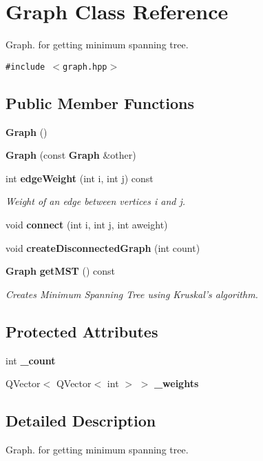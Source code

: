\section{Graph Class Reference}
\label{classGraph}
Graph. for getting minimum spanning tree.  


{\tt \#include $<$graph.hpp$>$}

\subsection*{Public Member Functions}
\begin{CompactItemize}
\item 
{\bf Graph} ()
\item 
{\bf Graph} (const {\bf Graph} \&other)
\item 
int {\bf edge\-Weight} (int i, int j) const 
\begin{CompactList}\small\item\em Weight of an edge between vertices i and j. \item\end{CompactList}\item 
void {\bf connect} (int i, int j, int aweight)
\item 
void {\bf create\-Disconnected\-Graph} (int count)
\item 
{\bf Graph} {\bf get\-MST} () const 
\begin{CompactList}\small\item\em Creates Minimum Spanning Tree using Kruskal's algorithm. \item\end{CompactList}\end{CompactItemize}
\subsection*{Protected Attributes}
\begin{CompactItemize}
\item 
int {\bf \_\-count}
\item 
QVector$<$ QVector$<$ int $>$ $>$ {\bf \_\-weights}
\end{CompactItemize}


\subsection{Detailed Description}
Graph. for getting minimum spanning tree. 



